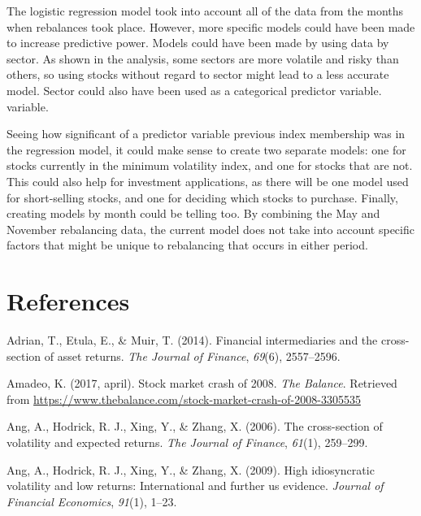 \documentclass[12pt,twoside]{reedthesis}
\theoremstyle{definition}
\theoremstyle{definition}
\theoremstyle{definition}
\theoremstyle{remark}
\begin{document}
The logistic regression model took into account all of the data from the
months when rebalances took place. However, more specific models could
have been made to increase predictive power. Models could have been made
by using data by sector. As shown in the analysis, some sectors are more
volatile and risky than others, so using stocks without regard to sector
might lead to a less accurate model. Sector could also have been used as
a categorical predictor variable. variable.

Seeing how significant of a predictor variable previous index membership
was in the regression model, it could make sense to create two separate
models: one for stocks currently in the minimum volatility index, and
one for stocks that are not. This could also help for investment
applications, as there will be one model used for short-selling stocks,
and one for deciding which stocks to purchase. Finally, creating models
by month could be telling too. By combining the May and November
rebalancing data, the current model does not take into account specific
factors that might be unique to rebalancing that occurs in either
period.

\backmatter

\chapter*{References}\label{references}


\noindent

\setlength{\parindent}{-0.20in} \setlength{\leftskip}{0.20in}
\setlength{\parskip}{8pt}

\hypertarget{refs}{}
\hypertarget{ref-adrian2014}{}
Adrian, T., Etula, E., \& Muir, T. (2014). Financial intermediaries and
the cross-section of asset returns. \emph{The Journal of Finance},
\emph{69}(6), 2557--2596.

\hypertarget{ref-amadeo2017}{}
Amadeo, K. (2017, april). Stock market crash of 2008. \emph{The
Balance}. Retrieved from
\url{https://www.thebalance.com/stock-market-crash-of-2008-3305535}

\hypertarget{ref-ang2006}{}
Ang, A., Hodrick, R. J., Xing, Y., \& Zhang, X. (2006). The
cross-section of volatility and expected returns. \emph{The Journal of
Finance}, \emph{61}(1), 259--299.

\hypertarget{ref-ang2009}{}
Ang, A., Hodrick, R. J., Xing, Y., \& Zhang, X. (2009). High
idiosyncratic volatility and low returns: International and further us
evidence. \emph{Journal of Financial Economics}, \emph{91}(1), 1--23.
\end{document}
